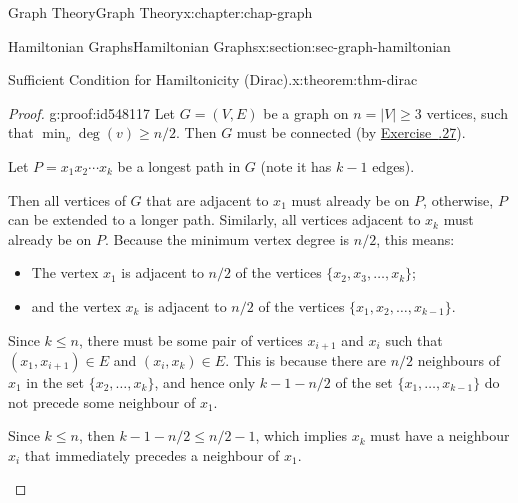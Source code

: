 \documentclass[oneside,10pt,]{book}
\newcommand{\xreffont}{\relax}
\numberwithin{equation}{section}
\begin{document}
\begin{chapterptx}{Graph Theory}{}{Graph Theory}{}{}{x:chapter:chap-graph}
\begin{sectionptx}{Hamiltonian Graphs}{}{Hamiltonian Graphs}{}{}{x:section:sec-graph-hamiltonian}
\begin{theorem}{Sufficient Condition for Hamiltonicity (Dirac).}{}{x:theorem:thm-dirac}
\end{theorem}
\begin{proof}{}{g:proof:id548117}
Let \(G = (V,E)\) be a graph on \(n = |V| \geq 3\) vertices, such that \(\min_v \deg(v) \geq n/2\). Then \(G\) must be connected (by \hyperlink{x:exercise:ex-deg-connected}{Exercise~{\xreffont 5.8.27}}).%
\par
Let \(P = x_1x_2\cdots x_k\) be a longest path in \(G\) (note it has \(k-1\) edges).%
\par
Then all vertices of \(G\) that are adjacent to \(x_1\) must already be on \(P\), otherwise, \(P\) can be extended to a longer path. Similarly, all vertices adjacent to \(x_k\) must already be on \(P\). Because the minimum vertex degree is \(n/2\), this means:%
\begin{itemize}[label=\textbullet]
\item{}The vertex \(x_1\) is adjacent to \(n/2\) of the vertices \(\{x_2,x_3,\ldots,x_k\}\);%
\item{}and the vertex \(x_k\) is adjacent to \(n/2\) of the vertices \(\{x_1,x_2,\ldots,x_{k-1}\}\).%
\end{itemize}
%
\par
Since \(k \leq n\), there must be some pair of vertices \(x_{i+1}\) and \(x_i\) such that \((x_1,x_{i+1}) \in E\) and \((x_i,x_k) \in E\). This is because there are \(n/2\) neighbours of \(x_1\) in the set \(\{x_2,\ldots,x_k\}\), and hence only \(k - 1 - n/2\) of the set \(\{x_1,\ldots,x_{k-1}\}\) do not precede some neighbour of \(x_1\).%
\par
Since \(k \leq n\), then \(k - 1 - n/2 \leq n/2-1\), which implies \(x_k\) must have a neighbour \(x_i\) that immediately precedes a neighbour of \(x_{1}\).%
\begin{sidebyside}{1}{0.2}{0.2}{0}%
\begin{sbspanel}{0.6}%
\end{sbspanel}
\end{sidebyside}
\end{proof}
\end{sectionptx}
\end{chapterptx}
\end{document}
